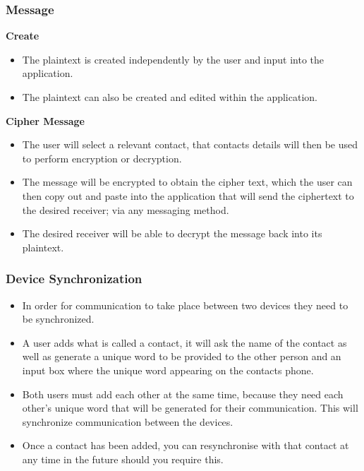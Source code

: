 \subsubsection{Message}
\textbf{Create}
\begin{itemize}
\item The plaintext is created independently by the user and input into the application.
\item The plaintext can also be created and edited within the application.
\end{itemize}
\textbf{Cipher Message}
\begin{itemize}
\item The user will select a relevant contact, that contacts details will then be used to perform encryption or decryption.
\item The message will be encrypted to obtain the cipher text, which the user can then copy out and paste into the application that will send the ciphertext to the desired receiver; via any messaging method.
\item The desired receiver will be able to decrypt the message back into its plaintext.
\end{itemize}

\subsubsection{Device Synchronization}
\begin{itemize}
\item In order for communication to take place between two devices they need to be synchronized.
\item A user adds what is called a contact, it will ask the name of the contact as well as generate a unique word to be provided to the other person and an input box where the unique word appearing on the contacts phone.
\item Both users must add each other at the same time, because they need each other's unique word that will be generated for their communication. This will synchronize communication between the devices.
\item Once a contact has been added, you can resynchronise with that contact at any time in the future should you require this.
\end{itemize}

